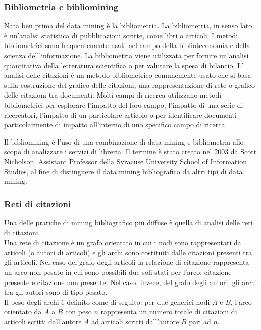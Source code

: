 \documentclass[a4paper, 12pt]{article}
\begin{document}
\subsubsection{Bibliometria e bibliomining}
Nata ben prima del data mining è la bibliometria. La bibliometria, in senso lato, è un'analisi statistica di pubblicazioni scritte, come libri o articoli. I metodi bibliometrici sono frequentemente usati nel campo della biblioteconomia e della scienza dell'informazione. La bibliometria viene utilizzata per fornire un'analisi quantitativa della letteratura scientifica o per valutare la spesa di bilancio. L' analisi delle citazioni è un metodo bibliometrico comunemente usato che si basa sulla costruzione del grafico delle citazioni, una rappresentazione di rete o grafico delle citazioni tra documenti. Molti campi di ricerca utilizzano metodi bibliometrici per esplorare l'impatto del loro campo, l'impatto di una serie di ricercatori, l'impatto di un particolare articolo o per identificare documenti particolarmente di impatto all'interno di uno specifico campo di ricerca.
\par
Il bibliomining \cite{NICHOLSON2006785} è l'uso di una combinazione di data mining e bibliometria allo scopo di analizzare i servizi di libreria. Il termine è stato creato nel 2003 da Scott Nicholson, Assistant Professor della Syracuse University School of Information Studies, al fine di distinguere il data mining bibliografico da altri tipi di data mining.
\subsubsection{Reti di citazioni}
Una delle pratiche di mining bibliografico più diffuse è quella di analisi delle reti di citazioni. \\
Una rete di citazione è un grafo orientato in cui i nodi sono rappresentati da articoli (o autori di articoli) e gli archi sono costituiti dalle citazioni presenti tra gli articoli. Nel caso del grafo degli articoli la relazione di citazione rappresenta un arco non pesato in cui sono possibili due soli stati per l'arco: citazione presente e citazione non presente.
Nel caso, invece, del grafo degli autori, gli archi tra gli autori sono di tipo pesato. \\
Il peso degli archi è definito come di seguito: per due generici nodi $A$ e $B$, l'arco orientato da $A$ a $B$ con peso $n$ rappresenta un numero totale di citazioni di articoli scritti dall'autore $A$ ad articoli scritti dall'autore $B$ pari ad $n$.
\end{document}
